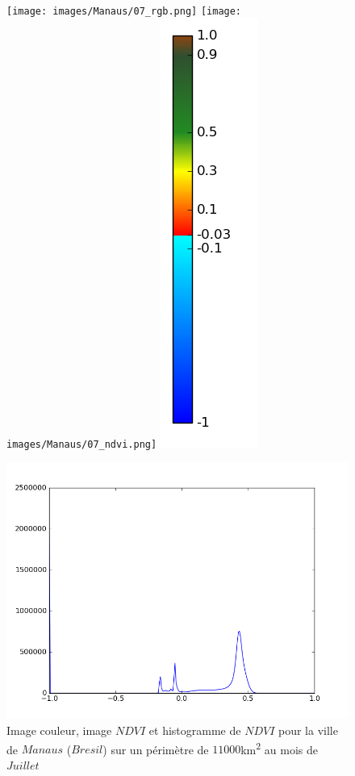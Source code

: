 \documentclass{book}
\begin{document}
\begin{figure}[H]
\centerline{
\texttt{[image: images/Manaus/07\_rgb.png]}
\texttt{[image: images/Manaus/07\_ndvi.png]}
\includegraphics[scale=0.4]{images/colormap.png}
}
\begin{center}
\includegraphics[scale=0.45]{images/Manaus/07_ndvi_histo.png}
\end{center}
\caption{Image couleur, image $NDVI$ et histogramme de $NDVI$ pour la ville de $Manaus$ ($Bresil$) sur un périmètre de $11000$km\textsuperscript{2} au mois de $Juillet$}
\label{manaus_ndvi}
\end{figure}
\end{document}
